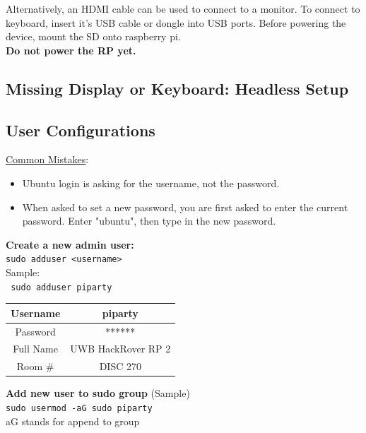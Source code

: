\documentclass[a4paper, 10pt]{article}
\begin{document}
            \noindent Alternatively, an HDMI cable can be used to connect to a monitor.
            To connect to keyboard, insert it’s USB cable or dongle into USB ports.
            Before powering the device, mount the SD onto raspberry pi. \\
                
            \noindent \textbf{Do not power the RP yet.} 

        \subsection{Missing Display or Keyboard: Headless Setup} 
        

        \subsection{User Configurations}
        \underline{Common Mistakes}:
        \begin{itemize}
            \item Ubuntu login is asking for the username, not the password.
            \item When asked to set a new password, you are first asked to enter the current password. Enter "ubuntu", then type in the new password.
        \end{itemize}
        
        \textbf{Create a new admin user:}\\
        \texttt{sudo adduser <username>} \\

        \noindent Sample: \\
        \texttt{ sudo adduser piparty} \
        \begin{flushleft}
            \begin{tabular}{|c|c|}
                \hline
                Username & piparty \\
                \hline
                Password & ****** \\
                \hline
                Full Name & UWB HackRover RP 2 \\
                \hline
                Room \# & DISC 270 \\
                \hline
            \end{tabular}
        \end{flushleft} 


        \noindent \textbf{Add new user to sudo group} (Sample)\\
        \texttt{sudo usermod -aG sudo piparty} \\
        aG stands for append to group \\
        
\end{document}
